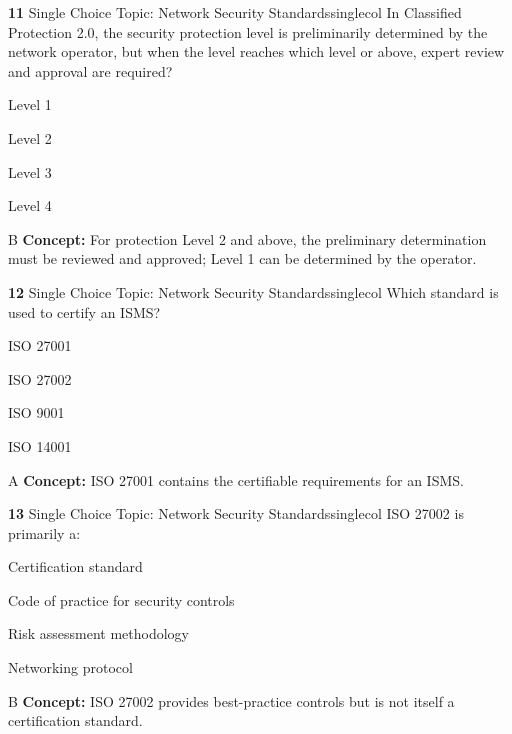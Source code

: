 \documentclass[10pt,a4paper]{article}
\begin{document}
\begin{qcard}{\color{white}\textbf{11} \hfill \small Single Choice \textbar{} Topic: Network Security Standards}{singlecol}
In Classified Protection 2.0, the security protection level is preliminarily determined by the network operator, but when the level reaches which level or above, expert review and approval are required?

\begin{qoptions}
\item Level 1
\item Level 2
\item Level 3
\item Level 4
\end{qoptions}
\begin{explainbox}{B}
\textbf{Concept:} For protection Level 2 and above, the preliminary determination must be reviewed and approved; Level 1 can be determined by the operator.
\end{explainbox}
\end{qcard}

\begin{qcard}{\color{white}\textbf{12} \hfill \small Single Choice \textbar{} Topic: Network Security Standards}{singlecol}
Which standard is used to certify an ISMS?

\begin{qoptions}
\item ISO 27001
\item ISO 27002
\item ISO 9001
\item ISO 14001
\end{qoptions}
\begin{explainbox}{A}
\textbf{Concept:} ISO 27001 contains the certifiable requirements for an ISMS.
\end{explainbox}
\end{qcard}

\begin{qcard}{\color{white}\textbf{13} \hfill \small Single Choice \textbar{} Topic: Network Security Standards}{singlecol}
ISO 27002 is primarily a:

\begin{qoptions}
\item Certification standard
\item Code of practice for security controls
\item Risk assessment methodology
\item Networking protocol
\end{qoptions}
\begin{explainbox}{B}
\textbf{Concept:} ISO 27002 provides best-practice controls but is not itself a certification standard.
\end{explainbox}
\end{qcard}
\end{document}
